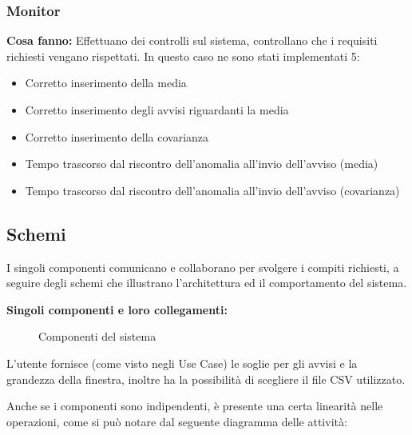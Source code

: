 \documentclass{article}
\begin{document}
\subsubsection{Monitor}
\textbf{Cosa fanno:} Effettuano dei controlli sul sistema, controllano che i requisiti richiesti vengano rispettati.
\vspace{5pt} 
\newline
In questo caso ne sono stati implementati 5:
\begin{itemize}
	\item Corretto inserimento della media
	\item Corretto inserimento degli avvisi riguardanti la media
	\item Corretto inserimento della covarianza
	\item Tempo trascorso dal riscontro dell'anomalia all'invio dell'avviso (media)
    \item Tempo trascorso dal riscontro dell'anomalia all'invio dell'avviso (covarianza)
\end{itemize}

\newpage

\subsection{Schemi}

I singoli componenti comunicano e collaborano per svolgere i compiti richiesti, a seguire degli schemi che illustrano l'architettura ed il comportamento del sistema.

\vspace{10pt}

\textbf{Singoli componenti e loro collegamenti:}

\vspace{10pt}

\begin{figure}[ht]
	\centering
	
	\caption{Componenti del sistema}
	\label{fig:componenti.svg}
\end{figure}

\vspace{12pt}

L'utente fornisce (come visto negli Use Case) le soglie per gli avvisi e la grandezza della finestra, inoltre ha
la possibilità di scegliere il file CSV utilizzato.

\newpage

Anche se i componenti sono indipendenti, è presente una certa linearità nelle operazioni, come si può notare dal seguente diagramma delle attività:
\end{document}
